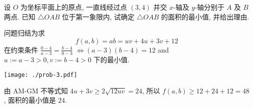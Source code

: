 \begin{prob}
\label{prob:prob-3}
设 $O$ 为坐标平面上的原点, 一直线经过点 $(3,4)$
并交 $x$-轴及 $y$-轴分别于 $A$ 及 $B$ 两点.
已知 $\triangle OAB$ 位于第一象限内,
试确定 $\triangle OAB$ 的面积的最小值, 并给出理由.
\end{prob}

\begin{soln}
问题归结为求
\begin{equation}
\label{eq:prob-3-eq-1}
f(a, b) = ab = uv + 4u + 3v + 12
\end{equation}
在约束条件 $\frac{0 - 4}{a - 3} = \frac{b - 4}{0 - 3}$
$\iff (a-3)(b-4) = 12$ and $u := a - 3 > 0, v := b - 4 > 0$ 下的最小值.

\begin{center}
\texttt{[image: ./prob-3.pdf]}
\end{center}

由 AM-GM 不等式知 $4u + 3v \ge 2\sqrt{12uv} = 24$,
所以 $f(a,b) \ge 12 + 24 + 12 = 48$,
面积的最小值是 $\boxed{24}$.
\end{soln}
